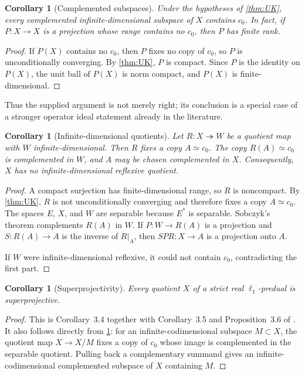 \documentclass[11pt]{article}
\newtheorem{corollary}[theorem]{Corollary}
\theoremstyle{definition}
\newcommand{\onto}{\twoheadrightarrow}
\newcommand{\isom}{\simeq}
\begin{document}
\begin{corollary}[Complemented subspaces]\label{cor:complemented}
Under the hypotheses of \cref{thm:UK}, every complemented
infinite-dimensional subspace of $X$ contains $c_0$.  In fact, if $P:X\to X$
is a projection whose range contains no $c_0$, then $P$ has finite rank.
\end{corollary}

\begin{proof}
If $P(X)$ contains no $c_0$, then $P$ fixes no copy of $c_0$, so $P$ is
unconditionally converging.  By \cref{thm:UK}, $P$ is compact.  Since $P$ is
the identity on $P(X)$, the unit ball of $P(X)$ is norm compact, and $P(X)$
is finite-dimensional.
\end{proof}

Thus the supplied argument is not merely right; its conclusion is a special
case of a stronger operator ideal statement already in the literature.

\begin{corollary}[Infinite-dimensional quotients]\label{cor:quotients}
Let $R:X\onto W$ be a quotient map with $W$ infinite-dimensional.  Then
$R$ fixes a copy $A\isom c_0$.  The copy $R(A)\isom c_0$ is complemented in
$W$, and $A$ may be chosen complemented in $X$.  Consequently, $X$ has no
infinite-dimensional reflexive quotient.
\end{corollary}

\begin{proof}
A compact surjection has finite-dimensional range, so $R$ is noncompact.
By \cref{thm:UK}, $R$ is not unconditionally converging and therefore fixes
a copy $A\isom c_0$.  The spaces $E$, $X$, and $W$ are separable because
$E^*$ is separable.  Sobczyk's theorem complements $R(A)$ in $W$.  If
$P:W\to R(A)$ is a projection and $S:R(A)\to A$ is the inverse of $R|_A$,
then $SPR:X\to A$ is a projection onto $A$.

If $W$ were infinite-dimensional reflexive, it could not contain $c_0$,
contradicting the first part.
\end{proof}

\begin{corollary}[Superprojectivity]\label{cor:super}
Every quotient $X$ of a strict real $\ell_1$-predual is superprojective.
\end{corollary}

\begin{proof}
This is Corollary~3.4 together with Corollary~3.5 and Proposition~3.6 of
\cite{GalegoGonzalezPello2017}.  It also follows directly from
\cref{cor:quotients}: for an infinite-codimensional subspace $M\subset X$,
the quotient map $X\to X/M$ fixes a copy of $c_0$ whose image is complemented
in the separable quotient.  Pulling back a complementary summand gives an
infinite-codimensional complemented subspace of $X$ containing $M$.
\end{proof}
\end{document}
